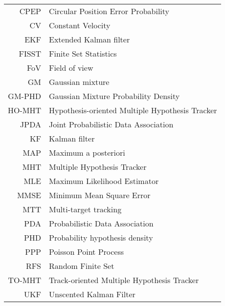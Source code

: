 \begin{tabular}{rl}
CPEP & Circular Position Error Probability \\
CV & Constant Velocity \\
EKF & Extended Kalman filter \\
FISST & Finite Set Statistics \\
FoV & Field of view \\
GM & Gaussian mixture \\
GM-PHD & Gaussian Mixture Probability Density \\
HO-MHT & Hypothesis-oriented Multiple Hypothesis Tracker \\
JPDA & Joint Probabilistic Data Association \\
KF & Kalman filter \\
MAP & Maximum a posteriori \\
MHT & Multiple Hypothesis Tracker \\
MLE & Maximum Likelihood Estimator \\
MMSE & Minimum Mean Square Error \\
MTT & Multi-target tracking \\
PDA & Probabilistic Data Association \\
PHD & Probability hypothesis density \\
PPP & Poisson Point Process \\
RFS & Random Finite Set \\
TO-MHT & Track-oriented Multiple Hypothesis Tracker \\
UKF & Unscented Kalman Filter \\
\end{tabular}
